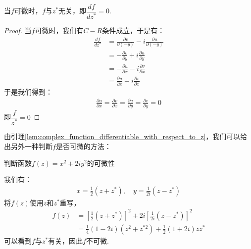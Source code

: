         \begin{lemma}
            \label{lem:complex_function_differentiable_with_respect_to_z}
            当$f$可微时，$f$与$z^*$无关，即$\dfrac{df}{dz^*} = 0$.
        \end{lemma}
        \begin{proof}
            当$f$可微时，我们有$C-R$条件成立，于是有：
            \allowdisplaybreaks
            \begin{align*}
                \frac{df}{dz^*} &= \frac{\partial v}{\partial (-y)} - i \frac{\partial u}{\partial (-y)}\\
                &= -\frac{\partial v}{\partial y} + i \frac{\partial u}{\partial y}\\
                &= -\frac{\partial u}{\partial x} - i \frac{\partial v}{\partial x}\\
                &= \frac{\partial u}{\partial x} + i \frac{\partial v}{\partial x}
            \end{align*}
            于是我们得到：
            \begin{align*}
                \frac{\partial u}{\partial x} = \frac{\partial v}{\partial x} = \frac{\partial u}{\partial y} = \frac{\partial v}{\partial y} = 0
            \end{align*}
            即$\dfrac{f}{z^*} = 0$
        \end{proof}
        由引理\ref{lem:complex_function_differentiable_with_respect_to_z}，我们可以给出另外一种判断$f$是否可微的方法：
        \begin{example}
            判断函数$f(z) = x^2 +2iy^2$的可微性
        \end{example}
        \begin{solution}
            我们有：
            \begin{align*}
                x = \frac{1}{2}(z + z^*), \quad y = \frac{1}{2i}(z - z^*)
            \end{align*}
            将$f(z)$使用$z$和$z^*$重写，
            \begin{align*}
                f(z) &= [\frac{1}{2}(z + z^*)]^2 + 2i[\frac{1}{2i}(z - z^*)]^2\\
                &= \frac{1}{4}(1 - 2i)(z^2 + z^{*2}) + \frac{1}{2}(1 + 2i)zz^*
            \end{align*}
            可以看到$f$与$z^*$有关，因此$f$不可微.
        \end{solution}

